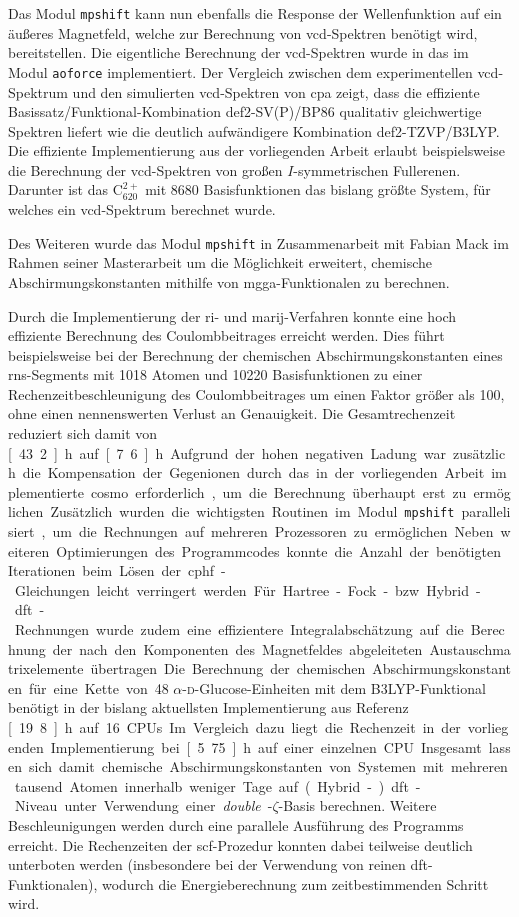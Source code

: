 Das Modul \texttt{mpshift} kann nun ebenfalls die Response der Wellenfunktion auf ein äußeres Magnetfeld, welche zur Berechnung von \ac{vcd}-Spektren benötigt wird, bereitstellen. Die eigentliche Berechnung der \ac{vcd}-Spektren wurde in das im Modul \texttt{aoforce} implementiert. Der Vergleich zwischen dem experimentellen \ac{vcd}-Spektrum und den simulierten \ac{vcd}-Spektren von \acl{cpa} zeigt, dass die effiziente Basissatz/Funktional-Kombination def2-SV(P)/BP86 qualitativ gleichwertige Spektren liefert wie die deutlich aufwändigere Kombination def2-TZVP/B3LYP. Die effiziente Implementierung aus der vorliegenden Arbeit erlaubt beispielsweise die Berechnung der \ac{vcd}-Spektren von großen $I$-symmetrischen Fullerenen. Darunter ist das C$_{620}^{2+}$ mit 8680 Basisfunktionen das bislang größte System, für welches ein \ac{vcd}-Spektrum berechnet wurde.

Des Weiteren wurde das Modul \texttt{mpshift} in Zusammenarbeit mit Fabian Mack im Rahmen seiner Masterarbeit um die Möglichkeit erweitert, chemische Abschirmungskonstanten mithilfe von \ac{mgga}-Funktionalen zu berechnen. 

\bigskip
Durch die Implementierung der \ac{ri}- und \ac{marij}-Verfahren konnte eine hoch effiziente Berechnung des Coulombbeitrages erreicht werden. Dies führt beispielsweise bei der Berechnung der chemischen Abschirmungskonstanten eines \ac{rns}-Segments mit 1018 Atomen und 10220 Basisfunktionen zu einer Rechenzeitbeschleunigung des Coulombbeitrages um einen Faktor größer als 100, ohne einen nennenswerten Verlust an Genauigkeit. Die Gesamtrechenzeit reduziert sich damit von \unit[43.2]{h} auf \unit[7.6]{h}. Aufgrund der hohen negativen Ladung war zusätzlich die Kompensation der Gegenionen durch das in der vorliegenden Arbeit implementierte \ac{cosmo} erforderlich, um die Berechnung überhaupt erst zu ermöglichen. Zusätzlich wurden die wichtigsten Routinen im Modul \texttt{mpshift} parallelisiert, um die Rechnungen auf mehreren Prozessoren zu ermöglichen. Neben weiteren Optimierungen des Programmcodes konnte die Anzahl der benötigten Iterationen beim Lösen der \ac{cphf}-Gleichungen leicht verringert werden. Für Hartree-Fock- bzw. Hybrid-\ac{dft}-Rechnungen wurde zudem eine effizientere Integralabschätzung auf die Berechnung der nach den Komponenten des Magnetfeldes abgeleiteten Austauschmatrixelemente übertragen. Die Berechnung der chemischen Abschirmungskonstanten für eine Kette von 48 $\alpha$-\textsc{d}-Glucose-Einheiten mit dem B3LYP-Funktional benötigt in der bislang aktuellsten Implementierung aus Referenz \cite{kumar2016nuclei} \unit[19.8]{h} auf 16 CPUs. Im Vergleich dazu liegt die Rechenzeit in der vorliegenden Implementierung bei \unit[5.75]{h} auf einer einzelnen CPU. Insgesamt lassen sich damit chemische Abschirmungskonstanten von Systemen mit mehreren tausend Atomen innerhalb weniger Tage auf (Hybrid-)\ac{dft}-Niveau unter Verwendung einer \textit{double}-$\zeta$-Basis berechnen. Weitere Beschleunigungen werden durch eine parallele Ausführung des Programms erreicht. Die Rechenzeiten der \ac{scf}-Prozedur konnten dabei teilweise deutlich unterboten werden (insbesondere bei der Verwendung von reinen \ac{dft}-Funktionalen), wodurch die Energieberechnung zum zeitbestimmenden Schritt wird.

